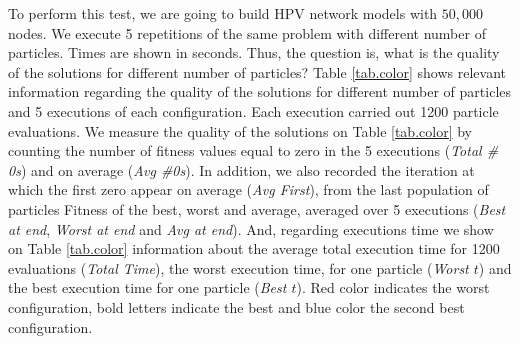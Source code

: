 To perform this test, we are going to build HPV network models with $50,000$ nodes. We execute 5 repetitions of the same problem with different number of particles. Times are shown in seconds. Thus, the question is, what is the quality of the solutions for different number of particles? Table \ref{tab.color} shows relevant information regarding the quality of the solutions for different number of particles and 5 executions of each configuration. Each execution carried out 1200 particle evaluations. We measure the quality of the solutions on Table \ref{tab.color} by counting the number of fitness values equal to zero in the 5 executions (\textit{Total \# 0s}) and on average (\textit{Avg \#0s}). In addition, we also recorded the iteration at which the first zero appear on average (\textit{Avg  First}), from the last population of particles Fitness of the best, worst and average, averaged over 5 executions (\textit{Best at end}, \textit{Worst at end} and \textit{Avg at end}). And, regarding executions time we show on Table  \ref{tab.color} information about the average total execution time for 1200 evaluations (\textit{Total Time}), the  worst execution time, for one particle (\textit{Worst $t$}) and the best execution time for one particle (\textit{Best $t$}). Red color indicates the worst configuration, bold letters indicate the best and blue color the second best configuration.


